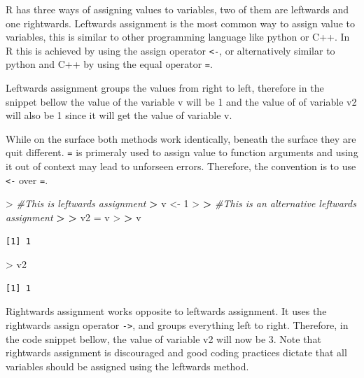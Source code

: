 \documentclass[
]{book}
\newenvironment{Shaded}{\begin{snugshade}}{\end{snugshade}}
\newcommand{\CommentTok}[1]{\textcolor[rgb]{0.56,0.35,0.01}{\textit{#1}}}
\newcommand{\DecValTok}[1]{\textcolor[rgb]{0.00,0.00,0.81}{#1}}
\newcommand{\ErrorTok}[1]{\textcolor[rgb]{0.64,0.00,0.00}{\textbf{#1}}}
\newcommand{\NormalTok}[1]{#1}
\newcommand{\OtherTok}[1]{\textcolor[rgb]{0.56,0.35,0.01}{#1}}
\newcommand{\SpecialCharTok}[1]{\textcolor[rgb]{0.00,0.00,0.00}{#1}}
\theoremstyle{definition}
\theoremstyle{definition}
\theoremstyle{definition}
\theoremstyle{definition}
\theoremstyle{remark}
\begin{document}
R has three ways of assigning values to variables, two of them are leftwards and one rightwards.
Leftwards assignment is the most common way to assign value to variables, this is similar to other programming language
like python or C++. In R this is achieved by using the assign operator \texttt{\textless{}-}, or alternatively similar to python and C++ by
using the equal operator \texttt{=}.

Leftwards assignment groups the values from right to left, therefore in the snippet bellow the value of the variable v will
be 1 and the value of of variable v2 will also be 1 since it will get the value of variable v.

While on the surface both methods work identically, beneath the surface they are quit different. \texttt{=} is primeraly used to
assign value to function arguments and using it out of context may lead to unforseen errors. Therefore, the convention is
to use \texttt{\textless{}-} over \texttt{=}.

\begin{Shaded}
\begin{Highlighting}[]
\SpecialCharTok{\textgreater{}} \CommentTok{\#This is leftwards assignment}
\ErrorTok{\textgreater{}}\NormalTok{ v }\OtherTok{\textless{}{-}} \DecValTok{1}
\SpecialCharTok{\textgreater{}} 
\ErrorTok{\textgreater{}} \CommentTok{\#This is an alternative leftwards assignment}
\ErrorTok{\textgreater{}} 
\ErrorTok{\textgreater{}}\NormalTok{ v2 }\OtherTok{=}\NormalTok{ v}
\SpecialCharTok{\textgreater{}} 
\ErrorTok{\textgreater{}}\NormalTok{ v}
\end{Highlighting}
\end{Shaded}

\begin{verbatim}
[1] 1
\end{verbatim}

\begin{Shaded}
\begin{Highlighting}[]
\SpecialCharTok{\textgreater{}}\NormalTok{ v2}
\end{Highlighting}
\end{Shaded}

\begin{verbatim}
[1] 1
\end{verbatim}

Rightwards assignment works opposite to leftwards assignment. It uses the rightwards assign operator \texttt{-\textgreater{}}, and groups
everything left to right. Therefore, in the code snippet bellow, the value of variable v2 will now be 3. Note that
rightwards assignment is discouraged and good coding practices dictate that all variables should be assigned using
the leftwards method.
\end{document}
